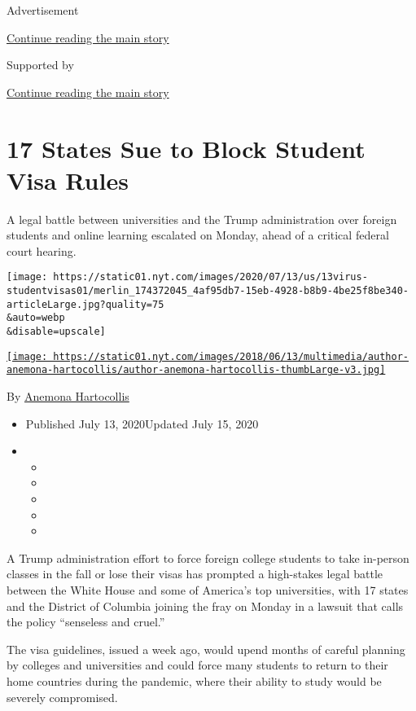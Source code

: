 Advertisement

\protect\hyperlink{after-top}{Continue reading the main story}

Supported by

\protect\hyperlink{after-sponsor}{Continue reading the main story}

\hypertarget{17-states-sue-to-block-student-visa-rules}{%
\section{17 States Sue to Block Student Visa
Rules}\label{17-states-sue-to-block-student-visa-rules}}

A legal battle between universities and the Trump administration over
foreign students and online learning escalated on Monday, ahead of a
critical federal court hearing.

\texttt{[image: https://static01.nyt.com/images/2020/07/13/us/13virus-studentvisas01/merlin\_174372045\_4af95db7-15eb-4928-b8b9-4be25f8be340-articleLarge.jpg?quality=75\\\&auto=webp\\\&disable=upscale]}

\href{https://www.nytimes.com/by/anemona-hartocollis}{\texttt{[image: https://static01.nyt.com/images/2018/06/13/multimedia/author-anemona-hartocollis/author-anemona-hartocollis-thumbLarge-v3.jpg]}}

By \href{https://www.nytimes.com/by/anemona-hartocollis}{Anemona
Hartocollis}

\begin{itemize}
\item
  Published July 13, 2020Updated July 15, 2020
\item
  \begin{itemize}
  \item
  \item
  \item
  \item
  \item
  \end{itemize}
\end{itemize}

A Trump administration effort to force foreign college students to take
in-person classes in the fall or lose their visas has prompted a
high-stakes legal battle between the White House and some of America's
top universities, with 17 states and the District of Columbia joining
the fray on Monday in a lawsuit that calls the policy ``senseless and
cruel.''

The visa guidelines, issued a week ago, would upend months of careful
planning by colleges and universities and could force many students to
return to their home countries during the pandemic, where their ability
to study would be severely compromised.

